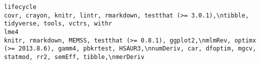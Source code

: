 \documentclass[
  letterpaper,
  DIV=11,
  numbers=noendperiod]{scrreprt}
\begin{document}
\begin{verbatim}
lifecycle                                                                                                                                                                                                                                                                                                                                                                                                                                                                                                                                                                                                                                                                                                                                                                                                                                                                                                                                                                                                                                                                                                                                                                                                 covr, crayon, knitr, lintr, rmarkdown, testthat (>= 3.0.1),\ntibble, tidyverse, tools, vctrs, withr
lme4                                                                                                                                                                                                                                                                                                                                                                                                                                                                                                                                                                                                                                                                                                                                                                                                                                                                                                                                                                                                                                                                                                                    knitr, rmarkdown, MEMSS, testthat (>= 0.8.1), ggplot2,\nmlmRev, optimx (>= 2013.8.6), gamm4, pbkrtest, HSAUR3,\nnumDeriv, car, dfoptim, mgcv, statmod, rr2, semEff, tibble,\nmerDeriv

\end{verbatim}
\end{document}
